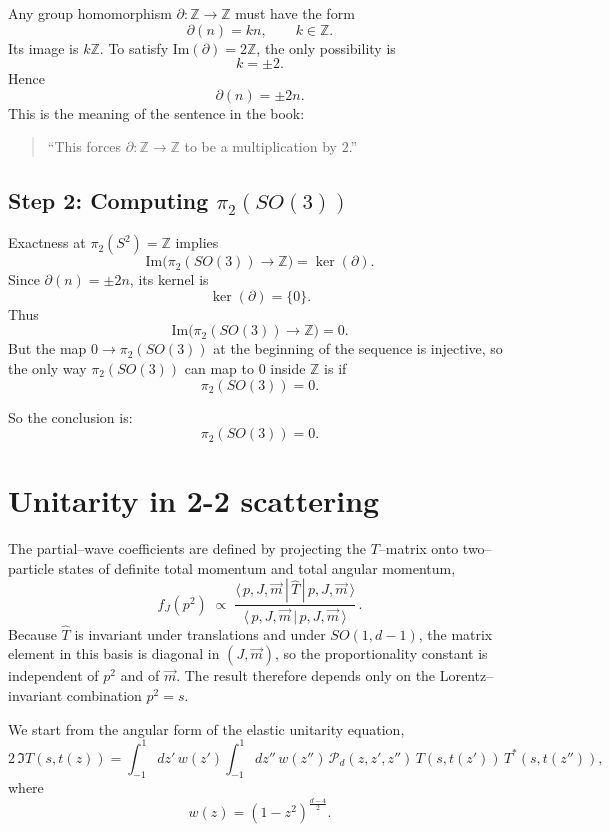 \documentclass[12pt]{article}
\begin{document}
Any group homomorphism $\partial : \mathbb{Z}\to \mathbb{Z}$ must have the form
\[
\partial(n)=kn,\qquad k\in\mathbb{Z}.
\]
Its image is $k\mathbb{Z}$.  
To satisfy $\mathrm{Im}(\partial)=2\mathbb{Z}$, the only possibility is
\[
k=\pm2.
\]
Hence
\[
\partial(n)=\pm 2n.
\]
This is the meaning of the sentence in the book:
\begin{quote}
``This forces $\partial : \mathbb{Z}\to\mathbb{Z}$ to be a multiplication by $2$.'' 
\end{quote}

\subsection{Step 2: Computing $\pi_2(SO(3))$}

Exactness at $\pi_2(S^2)=\mathbb{Z}$ implies
\[
\mathrm{Im}\big(\pi_2(SO(3))\longrightarrow\mathbb{Z}\big)
   = \ker(\partial).
\]
Since $\partial(n)=\pm 2n$, its kernel is
\[
\ker(\partial)=\{0\}.
\]
Thus
\[
\mathrm{Im}\big(\pi_2(SO(3))\to\mathbb{Z}\big)=0.
\]
But the map $0\to\pi_2(SO(3))$ at the beginning of the sequence is injective, so the only way
$\pi_2(SO(3))$ can map to $0$ inside $\mathbb{Z}$ is if
\[
\pi_2(SO(3))=0.
\]

So the conclusion is:
\[
\boxed{\pi_2(SO(3))=0.}
\]

\section{Unitarity in 2-2 scattering}
The partial–wave coefficients are defined by projecting the 
$T$–matrix onto two–particle states of definite total momentum 
and total angular momentum,
%
\begin{equation}
f_J(p^2)\;\propto\;
\frac{
\langle\,p , J , \vec m \,|\, \hat T \,|\, p , J , \vec m\,\rangle
}{
\langle\,p , J , \vec m \,|\, p , J , \vec m\,\rangle
}\, .
\label{eq:partialwave-def}
\end{equation}
%
Because $\hat T$ is invariant under translations and under
$SO(1,d{-}1)$, the matrix element in this basis is diagonal in 
$(J,\vec m)$, so the proportionality constant is independent of 
$p^2$ and of $\vec m$.  The result therefore depends only on the 
Lorentz–invariant combination $p^2=s$.

We start from the angular form of the elastic unitarity equation,
%
\begin{equation}
2\,\Im T(s,t(z))
=\int_{-1}^{1}\!dz'\,w(z')\!\int_{-1}^{1}\!dz''\,w(z'')\,
\mathcal P_d(z,z',z'')\,
T(s,t(z'))\,T^*(s,t(z'')),
\label{eq:unitarity-angular}
\end{equation}
%
where
\[
w(z)=(1-z^2)^{\frac{d-4}{2}}.
\]
\end{document}
